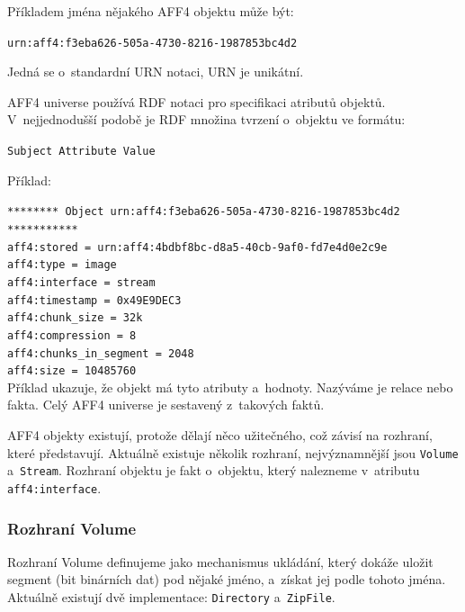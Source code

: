 \noindent Příkladem jména nějakého AFF4 objektu může být:

\texttt{urn:aff4:f3eba626-505a-4730-8216-1987853bc4d2}

\noindent Jedná se o~standardní URN notaci, URN je unikátní.

\vspace{0.5cm}

\noindent AFF4 universe používá RDF notaci pro specifikaci atributů objektů. V~nejjednodušší podobě je RDF množina tvrzení o~objektu ve formátu:

\texttt{Subject   Attribute   Value}

\vspace{0.5cm}

\noindent Příklad:

\noindent \texttt{******** Object urn:aff4:f3eba626-505a-4730-8216-1987853bc4d2 ***********}\\
\texttt{aff4:stored = urn:aff4:4bdbf8bc-d8a5-40cb-9af0-fd7e4d0e2c9e}\\
\texttt{aff4:type = image}\\
\texttt{aff4:interface = stream}\\
\texttt{aff4:timestamp = 0x49E9DEC3}\\
\texttt{aff4:chunk\_size = 32k}\\
\texttt{aff4:compression = 8}\\
\texttt{aff4:chunks\_in\_segment = 2048}\\
\texttt{aff4:size = 10485760}\\

\noindent Příklad ukazuje, že objekt má tyto atributy a~hodnoty. Nazýváme je relace nebo fakta. Celý AFF4 universe je sestavený z~takových faktů.

\noindent AFF4 objekty existují, protože dělají něco užitečného, což závisí na rozhraní, které představují. Aktuálně existuje několik rozhraní, nejvýznamnější jsou \texttt{Volume} a~\texttt{Stream}. Rozhraní objektu je fakt o~objektu, který nalezneme v~atributu \texttt{aff4:interface}.

\subsubsection{Rozhraní Volume}
Rozhraní Volume definujeme jako mechanismus ukládání, který dokáže uložit segment (bit binárních dat) pod nějaké jméno, a~získat jej podle tohoto jména. Aktuálně existují dvě implementace: \texttt{Directory} a~\texttt{ZipFile}.

